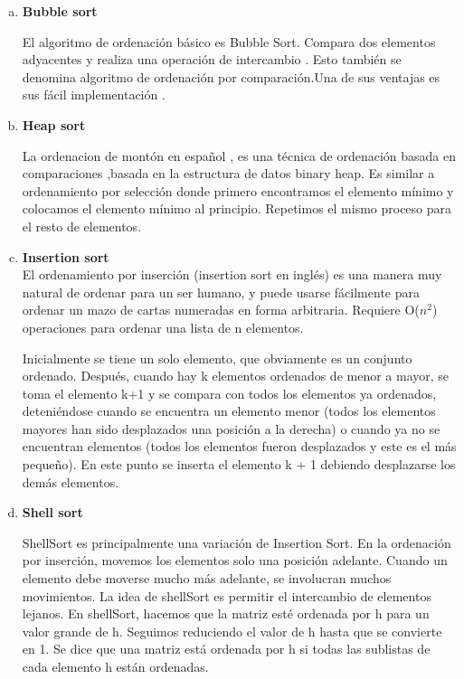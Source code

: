 \documentclass[a4paper]{article}
\begin{document}
\begin{enumerate}[a)]

\item \textbf{Bubble sort}

El algoritmo de ordenación básico es Bubble Sort. Compara dos elementos adyacentes y realiza una operación de intercambio . Esto también se denomina algoritmo de ordenación  por comparación.Una de sus ventajas es sus fácil  implementación .

\item \textbf{Heap sort}

La ordenacion de montón en español , es una técnica de ordenación basada en comparaciones ,basada en la estructura de datos binary heap. Es similar a ordenamiento por selección donde primero encontramos el elemento mínimo y colocamos el elemento mínimo al principio. Repetimos el mismo proceso para el resto de elementos\cite{heap}.

\item \textbf{Insertion sort}
\\
El ordenamiento por inserción (insertion sort en inglés) es una manera muy natural de ordenar para un ser humano, y puede usarse fácilmente para ordenar un mazo de cartas numeradas en forma arbitraria. Requiere O($n^{2}$) operaciones para ordenar una lista de  n elementos.

Inicialmente se tiene un solo elemento, que obviamente es un conjunto ordenado. Después, cuando hay  k elementos ordenados de menor a mayor, se toma el elemento k+1 y se compara con todos los elementos ya ordenados, deteniéndose cuando se encuentra un elemento menor (todos los elementos mayores han sido desplazados una posición a la derecha) o cuando ya no se encuentran elementos (todos los elementos fueron desplazados y este es el más pequeño). En este punto se inserta el elemento k + 1 debiendo desplazarse los demás elementos\cite{inser}.

\item \textbf{ Shell sort}

ShellSort es principalmente una variación de Insertion Sort. En la ordenación por inserción, movemos los elementos solo una posición adelante. Cuando un elemento debe moverse mucho más adelante, se involucran muchos movimientos. La idea de shellSort es permitir el intercambio de elementos lejanos. En shellSort, hacemos que la matriz esté ordenada por h para un valor grande de h. Seguimos reduciendo el valor de h hasta que se convierte en 1. Se dice que una matriz está ordenada por h si todas las sublistas de cada elemento h están ordenadas\cite{shell}.


\end{enumerate}
\end{document}
